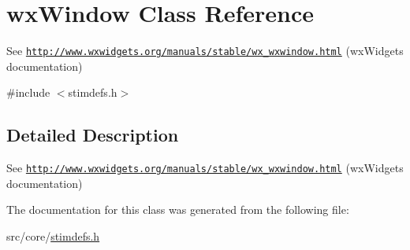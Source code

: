 \hypertarget{classwxWindow}{
\section{wxWindow Class Reference}
\label{classwxWindow}
}


See \href{http://www.wxwidgets.org/manuals/stable/wx_wxwindow.html}{\tt http://www.wxwidgets.org/manuals/stable/wx\_\-wxwindow.html} (wxWidgets documentation)  




{\ttfamily \#include $<$stimdefs.h$>$}



\subsection{Detailed Description}
See \href{http://www.wxwidgets.org/manuals/stable/wx_wxwindow.html}{\tt http://www.wxwidgets.org/manuals/stable/wx\_\-wxwindow.html} (wxWidgets documentation) 

The documentation for this class was generated from the following file:\begin{DoxyCompactItemize}
\item 
src/core/\hyperlink{stimdefs_8h}{stimdefs.h}\end{DoxyCompactItemize}
